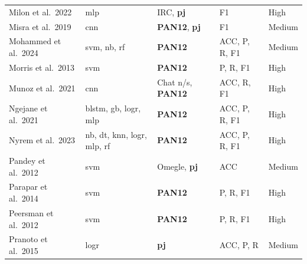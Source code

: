 \documentclass[12pt,a4paper,oneside]{report}
\begin{document}
\begin{table}[ht]
\begin{tabular}{p{3.5cm} p{4.2cm} p{3.0cm} p{2.2cm} p{1.2cm}}
Milon et al.\ 2022          & \acrshort{mlp}                                                                                    & IRC, \textbf{\acrshort{pj}}        & F1                         & High   \\
Misra et al.\ 2019          & \acrshort{cnn}                                                                                    & \textbf{PAN12}, \textbf{\acrshort{pj}} & F1                     & Medium \\
Mohammed et al.\ 2024       & \acrshort{svm}, \acrshort{nb}, \acrshort{rf}                                                      & \textbf{PAN12}                     & ACC, P, R, F1              & Medium \\
Morris et al.\ 2013         & \acrshort{svm}                                                                                    & \textbf{PAN12}                     & P, R, F1                   & High   \\
Munoz et al.\ 2021          & \acrshort{cnn}                                                                                    & Chat n/s, \textbf{PAN12}           & ACC, R, F1                 & High   \\
Ngejane et al.\ 2021        & \acrshort{blstm}, \acrshort{gb}, \acrshort{logr}, \acrshort{mlp}                                  & \textbf{PAN12}                     & ACC, P, R, F1              & High   \\
Nyrem et al.\ 2023          & \acrshort{nb}, \acrshort{dt}, \acrshort{knn}, \acrshort{logr}, \acrshort{mlp}, \acrshort{rf}      & \textbf{PAN12}                     & ACC, P, R, F1              & High   \\
Pandey et al.\ 2012         & \acrshort{svm}                                                                                    & Omegle, \textbf{\acrshort{pj}}     & ACC                        & Medium \\
Parapar et al.\ 2014        & \acrshort{svm}                                                                                    & \textbf{PAN12}                     & P, R, F1                   & High   \\
Peersman et al.\ 2012       & \acrshort{svm}                                                                                    & \textbf{PAN12}                     & P, R, F1                   & High   \\
Pranoto et al.\ 2015        & \acrshort{logr}                                                                                   & \textbf{\acrshort{pj}}             & ACC, P, R                  & Medium \\

\end{tabular}
\end{table}
\end{document}
